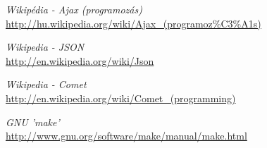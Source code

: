 \documentclass[12pt,a4paper,twoside]{article}
\begin{document}
\begin{thebibliography}{99}
  \emph{Wikipédia - Ajax (programozás)}\\
  \url{http://hu.wikipedia.org/wiki/Ajax_(programoz\%C3\%A1s)}

  \emph{Wikipedia - JSON}\\
  \url{http://en.wikipedia.org/wiki/Json}

  \emph{Wikipedia - Comet}\\
  \url{http://en.wikipedia.org/wiki/Comet_(programming)}

  \emph{GNU 'make'}\\
  \url{http://www.gnu.org/software/make/manual/make.html}

\end{thebibliography}
\end{document}
